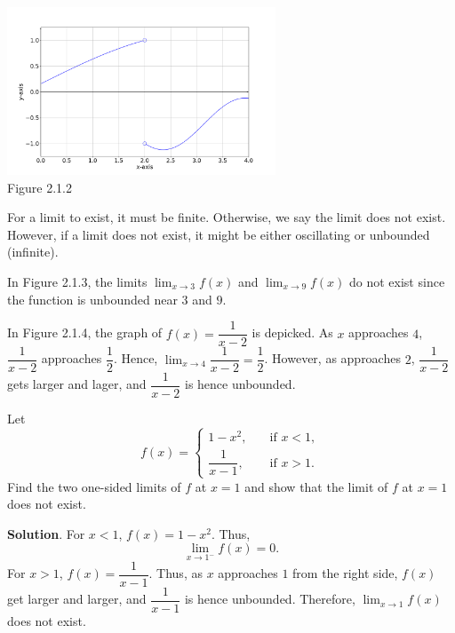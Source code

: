 \documentclass[11pt]{book}
\theoremstyle{break}
\theoremstyle{no_label}
\newcommand{\figtag}[1]{\\[-1.2em]Figure {#1}}
\numberwithin{equation}{section}
\begin{document}
\begin{center}
    \includegraphics[width=0.6\textwidth]{jumpy.png}\figtag{2.1.2}
\end{center}

\begin{remark}
    For a limit to exist, it must be finite. Otherwise, we say the limit does not exist. However, if a limit does not exist, it might be either oscillating or unbounded (infinite).
\end{remark}

\begin{example}
    In Figure 2.1.3, the limits $\displaystyle\lim_{x\to 3} f(x)$ and $\displaystyle\lim_{x\to 9} f(x)$ do not exist since the function is unbounded near $3$ and $9$.
\end{example}

\begin{example}
    In Figure 2.1.4, the graph of $f(x)=\dfrac{1}{x-2}$ is depicked. As $x$ approaches $4$, $\dfrac{1}{x-2}$ approaches $\dfrac{1}{2}$. Hence, $\displaystyle\lim_{x\to 4}\dfrac{1}{x-2}=\dfrac{1}{2}$. However, as approaches $2$, $\dfrac{1}{x-2}$ gets larger and lager, and $\dfrac{1}{x-2}$ is hence unbounded.
\end{example}

\begin{example}
    Let $$f(x)=\left\{\begin{array}{rl}
        1-x^2, \quad & \text{if $x<1$},\\\dfrac{1}{x-1}, \quad & \text{if $x>1$}.
    \end{array}\right.$$ Find the two one-sided limits of $f$ at $x=1$ and show that the limit of $f$ at $x=1$ does not exist.
\end{example}
\textbf{Solution}. For $x<1$, $f(x)=1-x^2$. Thus, $$\lim_{x\to1^-}f(x)=0.$$ For $x>1$, $f(x)=\dfrac{1}{x-1}$. Thus, as $x$ approaches $1$ from the right side, $f(x)$ get larger and larger, and $\dfrac{1}{x-1}$ is hence unbounded. Therefore, $\displaystyle\lim_{x\to 1}f(x)$ does not exist.
\end{document}
